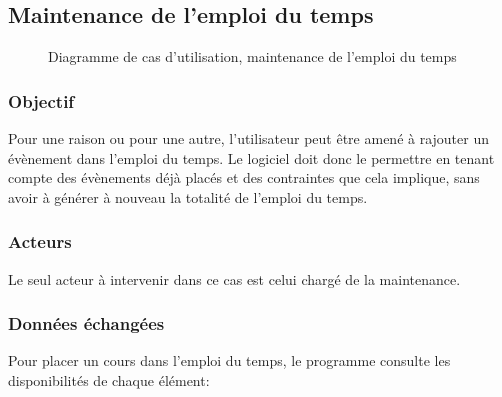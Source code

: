 \documentclass[12pt,a4paper,french]{article}
\begin{document}
\subsection{Maintenance de l'emploi du temps}    
\begin{figure}[! ht ]
    \centering
    \begin{minipage}[t]{14 cm}
        \centering
        \caption {Diagramme de cas d'utilisation, maintenance de l'emploi du temps}
    \end{minipage}
\end{figure}
            
\subsubsection{Objectif}
Pour une raison ou pour une autre, l'utilisateur peut être amené à rajouter un évènement dans l'emploi du temps. Le logiciel doit donc le permettre en tenant  compte des évènements déjà placés et des contraintes que cela implique, sans avoir à générer à nouveau la totalité de l'emploi du temps. 
                
\subsubsection{Acteurs}
Le seul acteur à intervenir dans ce cas est celui chargé de la maintenance.
            
\subsubsection{Données échangées}
Pour placer un cours dans l'emploi du temps, le programme consulte les disponibilités de chaque élément:
\end{document}
